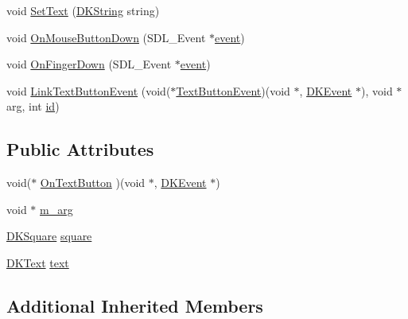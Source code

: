 \begin{DoxyCompactItemize}
\item 
void \hyperlink{class_d_k_text_button_a2d299d4e613c48615efc403e0b81d8a1}{Set\-Text} (\hyperlink{_d_k_string_8h_ac168e8555ceba18e1a2919b21976bc84}{D\-K\-String} string)
\item 
void \hyperlink{class_d_k_text_button_aa1f2b191cc3a8bca37c2be19df1b1519}{On\-Mouse\-Button\-Down} (S\-D\-L\-\_\-\-Event $\ast$\hyperlink{class_d_k_event_a3deebb932ed734363c4ece87971bc45f}{event})
\item 
void \hyperlink{class_d_k_text_button_a59214b4749a1e3239c2de4af780f4a91}{On\-Finger\-Down} (S\-D\-L\-\_\-\-Event $\ast$\hyperlink{class_d_k_event_a3deebb932ed734363c4ece87971bc45f}{event})
\item 
void \hyperlink{class_d_k_text_button_a5fa46c778ecf1084af6f818ac29cadb9}{Link\-Text\-Button\-Event} (void($\ast$\hyperlink{class_d_k_event_a8f7ae45d76194181ee72d85e364faeca}{Text\-Button\-Event})(void $\ast$, \hyperlink{class_d_k_event}{D\-K\-Event} $\ast$), void $\ast$arg, int \hyperlink{class_d_k_event_a46877918e12fcb3b2c8988379b6fa6fa}{id})
\end{DoxyCompactItemize}
\subsection*{Public Attributes}
\begin{DoxyCompactItemize}
\item 
void($\ast$ \hyperlink{class_d_k_text_button_af353826e25d77af6419be6efae0ad978}{On\-Text\-Button} )(void $\ast$, \hyperlink{class_d_k_event}{D\-K\-Event} $\ast$)
\item 
void $\ast$ \hyperlink{class_d_k_text_button_ab82fe6e9f84d902c1d2139f889a92e02}{m\-\_\-arg}
\item 
\hyperlink{class_d_k_square}{D\-K\-Square} \hyperlink{class_d_k_text_button_aa1ad37f6fe8792acbe9bc5cb90af26e8}{square}
\item 
\hyperlink{class_d_k_text}{D\-K\-Text} \hyperlink{class_d_k_text_button_a74348ac1721ad5882f91b102a64271c2}{text}
\end{DoxyCompactItemize}
\subsection*{Additional Inherited Members}


